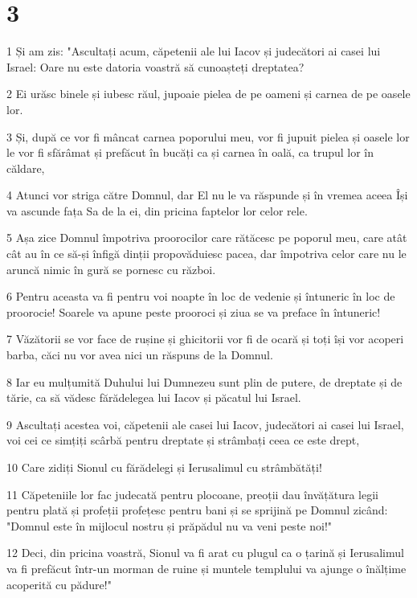 \chapter{3}

\par 1 Și am zis: "Ascultați acum, căpetenii ale lui Iacov și judecători ai casei lui Israel: Oare nu este datoria voastră să cunoașteți dreptatea?
\par 2 Ei urăsc binele și iubesc răul, jupoaie pielea de pe oameni și carnea de pe oasele lor.
\par 3 Și, după ce vor fi mâncat carnea poporului meu, vor fi jupuit pielea și oasele lor le vor fi sfărâmat și prefăcut în bucăți ca și carnea în oală, ca trupul lor în căldare,
\par 4 Atunci vor striga către Domnul, dar El nu le va răspunde și în vremea aceea Își va ascunde fața Sa de la ei, din pricina faptelor lor celor rele.
\par 5 Așa zice Domnul împotriva proorocilor care rătăcesc pe poporul meu, care atât cât au în ce să-și înfigă dinții propovăduiesc pacea, dar împotriva celor care nu le aruncă nimic în gură se pornesc cu război.
\par 6 Pentru aceasta va fi pentru voi noapte în loc de vedenie și întuneric în loc de proorocie! Soarele va apune peste prooroci și ziua se va preface în întuneric!
\par 7 Văzătorii se vor face de rușine și ghicitorii vor fi de ocară și toți își vor acoperi barba, căci nu vor avea nici un răspuns de la Domnul.
\par 8 Iar eu mulțumită Duhului lui Dumnezeu sunt plin de putere, de dreptate și de tărie, ca să vădesc fărădelegea lui Iacov și păcatul lui Israel.
\par 9 Ascultați acestea voi, căpetenii ale casei lui Iacov, judecători ai casei lui Israel, voi cei ce simțiți scârbă pentru dreptate și strâmbați ceea ce este drept,
\par 10 Care zidiți Sionul cu fărădelegi și Ierusalimul cu strâmbătăți!
\par 11 Căpeteniile lor fac judecată pentru plocoane, preoții dau învățătura legii pentru plată și profeții profețesc pentru bani și se sprijină pe Domnul zicând: "Domnul este în mijlocul nostru și prăpădul nu va veni peste noi!"
\par 12 Deci, din pricina voastră, Sionul va fi arat cu plugul ca o țarină și Ierusalimul va fi prefăcut într-un morman de ruine și muntele templului va ajunge o înălțime acoperită cu pădure!"

